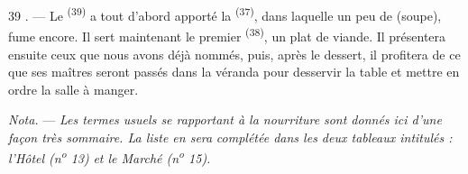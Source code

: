 \begin{VUpage}[41]{39}
. --- Le  \textsuperscript{(39)} a tout d'abord apporté la\nl
{} \textsuperscript{(37)}, dans laquelle un peu de  (soupe),\nl
fume encore. Il sert maintenant le premier  \textsuperscript{(38)},\nl
un plat de viande. Il présentera ensuite ceux que\nl
nous avons déjà nommés, puis, après le dessert, il\nl
profitera de ce que ses maîtres seront passés dans la\nl
véranda pour desservir la table et mettre en ordre la\nl
salle à manger.

\VUblancAlinea
\textit{Nota.} --- \textit{Les termes usuels se rapportant à la nourriture}\nl
\textit{sont donnés ici d'une façon très sommaire. La liste en sera}\nl
\textit{complétée dans les deux tableaux intitulés : l'Hôtel (n\textsuperscript{o} 13)}\nl
\textit{et le Marché (n\textsuperscript{o} 15).}
\end{VUpage}

